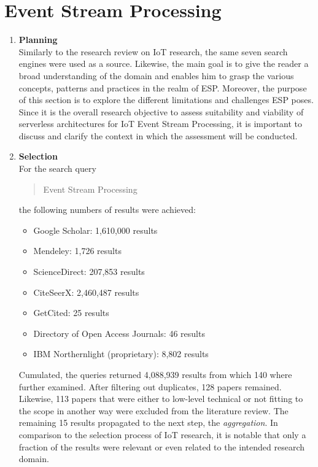 \section{Event Stream Processing}

\begin{enumerate}
    \item
    \textbf{Planning}\\
    Similarly to the research review on \acf{IoT} research, the same seven search engines were used as a source. Likewise, the main goal is to give the reader a broad understanding of the domain and enables him to grasp the various concepts, patterns and practices in the realm of \acf{ESP}. Moreover, the purpose of this section is to explore the different limitations and challenges \acf{ESP} poses. Since it is the overall research objective to assess suitability and viability of serverless architectures for IoT Event Stream Processing, it is important to discuss and clarify the context in which the assessment will be conducted. 
    
    \item
    \textbf{Selection}\\
    For the search query \blockquote{Event Stream Processing} the following numbers of results were achieved:
    
    \begin{itemize}
        \renewcommand\labelitemi{--}
        \item Google Scholar:  1,610,000 results
        \item Mendeley: 1,726 results
        \item ScienceDirect: 207,853 results
        \item CiteSeerX: 2,460,487 results
        \item GetCited: 25 results
        \item Directory of Open Access Journals: 46 results
        \item IBM Northernlight (proprietary): 8,802  results
    \end{itemize}
    
    Cumulated, the queries returned 4,088,939 results from which 140 where further examined. After filtering out duplicates, 128 papers remained. Likewise, 113 papers that were either to low-level technical or not fitting to the scope in another way were excluded from the literature review. The remaining 15 results propagated to the next step, the \textit{aggregation}. In comparison to the selection process of IoT research, it is notable that only a fraction of the results were relevant or even related to the intended research domain.
    

\end{enumerate}
